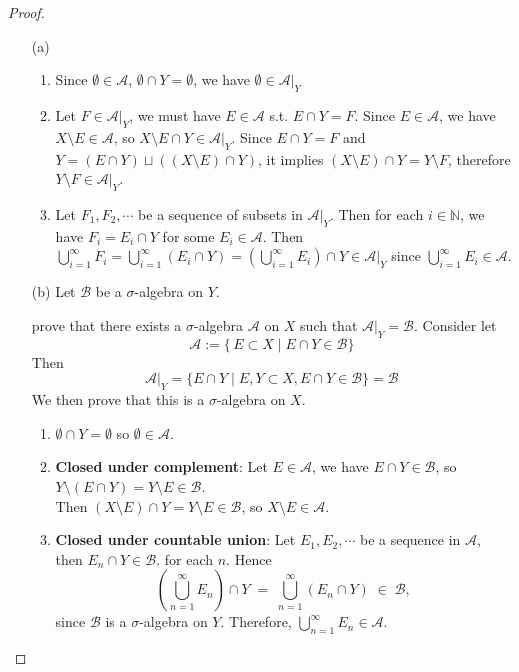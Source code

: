 \documentclass[lang=cn,11pt]{elegantbook}
\begin{document}
\begin{proof}
    \begin{itemize}
    \item[(a)] 
    \begin{enumerate}
        \item Since $\emptyset \in\mathcal{A}$, $\emptyset \cap Y = \emptyset$, we have $\emptyset \in\mathcal{A}|_{Y}$
        \item Let $F \in \mathcal{A}|_{Y}$, we must have $E \in \mathcal{A}$ s.t. $E\cap Y = F$. Since $E\in \mathcal{A}$, we have $X\setminus E \in \mathcal{A}$, so $X \setminus E \cap Y \in \mathcal{A}|_{Y}$. Since $E \cap Y = F$ and $Y = (E \cap Y) \sqcup ((X \setminus E) \cap Y)$, it implies $(X \setminus E) \cap Y = Y\setminus F$, therefore $Y \setminus F \in \mathcal{A}|_{Y}$.
        \item Let $F_1, F_2,\cdots$ be a sequence of subsets in $\mathcal{A}|_{Y}$. Then for each $i\in \mathbb{N}$, we have $F_i = E_i \cap Y$ for some $E_i \in \mathcal{A}$. Then $\bigcup_{i=1}^\infty F_i = \bigcup_{i=1}^\infty (E_i\cap Y) = (\bigcup_{i=1}^\infty E_i) \cap Y \in \mathcal{A}|_{Y}$ since $\bigcup_{i=1}^\infty E_i \in \mathcal{A}$. 
    \end{enumerate}
    
    \item[(b)] Let $\mathcal{B}$ be a $\sigma$-algebra on $Y$.
    
    
    prove that there exists a $\sigma$-algebra $\mathcal{A}$ on $X$ such that $\mathcal{A}|_Y = \mathcal{B}$.
    Consider let 
    $$
    \mathcal{A} := \{\,E \subset X \mid E \cap Y \in \mathcal{B}\}
    $$
    Then 
    $$
    \mathcal{A} |_{Y} = \{ E \cap Y \mid E,Y\subset X,E \cap Y \in \mathcal{B}  \} = \mathcal{B}
    $$            
    We then prove that this is a $\sigma$-algebra on $X$. \\
    \begin{enumerate}
        \item  $\emptyset \cap Y = \emptyset$ so $\emptyset \in \mathcal{A}$. 
        \item \textbf{Closed under complement}: Let $E \in \mathcal{A}$, we have $E \cap Y \in \mathcal{B}$, so $Y \setminus (E\cap Y ) = Y\setminus E \in \mathcal{B}$.\\
        Then $(X\setminus E) \cap Y  = Y \setminus E 
        \in \mathcal{B}$, so $X\setminus E \in \mathcal{A}$. 
        \item \textbf{Closed under countable union}: Let $E_1,E_2,\cdots$ be a sequence in $\mathcal{A}$, then \(E_n \cap Y \in \mathcal{B}\). for each $n$. 
        Hence
     \[
       \left(\bigcup_{n=1}^\infty E_n\right) \cap Y
       \;=\; \bigcup_{n=1}^\infty (E_n \cap Y)
       \;\in\; \mathcal{B},
     \]
     since \(\mathcal{B}\) is a \(\sigma\)-algebra on \(Y\).  Therefore, \(\bigcup_{n=1}^\infty E_n \in \mathcal{A}\).  
     

\end{enumerate}
\end{itemize}
\end{proof}
\end{document}
